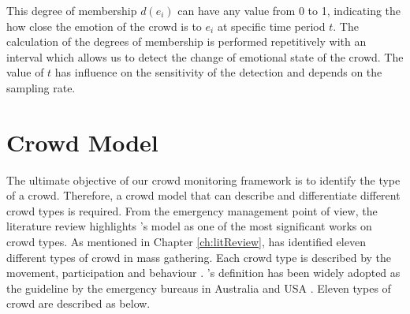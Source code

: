 This degree of membership \(d(e_i)\) can have any value from 0 to 1, indicating the how close the emotion of the crowd is to \(e_i\) at specific time period \(t\). The calculation of the degrees of membership is performed repetitively with an interval which allows us to detect the change of emotional state of the crowd. The value of \(t\) has influence on the sensitivity of the detection and depends on the sampling rate.

\section{Crowd Model}

The ultimate objective of our crowd monitoring framework is to identify the type of a crowd. Therefore, a crowd model that can describe and differentiate different crowd types is required. From the emergency management point of view, the literature review highlights \citet{Berlonghi1995}'s model as one of the most significant works on crowd types. As mentioned in Chapter \ref{ch:litReview}, \citet{Berlonghi1995} has identified eleven different types of crowd in mass gathering. Each crowd type is described by the movement, participation and behaviour \citep{Zeitz2009}. \citet{Berlonghi1995}'s definition has been widely adopted as the guideline by the emergency bureaus in Australia \citep{EMA1999} and USA \citep{FEMA2005}. Eleven types of crowd are described as below.

